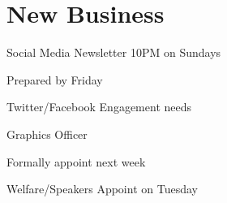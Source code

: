 \documentclass[11pt,hacksoc]{meetingmins}
\begin{document}
\section{New Business}
\begin{items}
	\item
	Social Media
		\subitem
		Newsletter
			\subsubitem
			10PM on Sundays
			
			\subsubitem
			Prepared by Friday
			
		\subitem
		Twitter/Facebook
			\subsubitem
			Engagement needs 
			
	\item
	Graphics Officer
		\item
		Formally appoint next week
		
	\item
	Welfare/Speakers
		\subitem
		Appoint on Tuesday
\end{items}

\vspace{1em}
\end{document}
